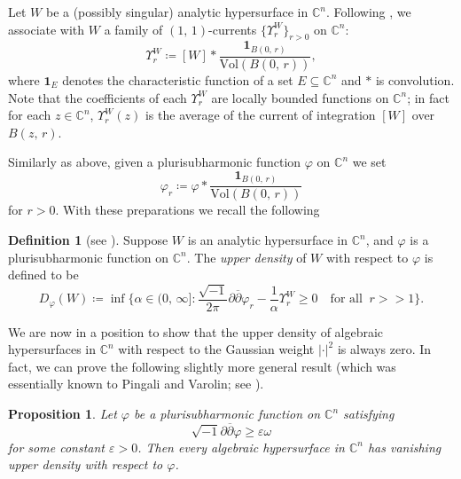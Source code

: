 \documentclass[12pt,a4paper]{amsart}
\numberwithin{equation}{section}
\newtheorem{proposition}[theorem]{Proposition}
\theoremstyle{definition}
\newtheorem{definition}{Definition}
\begin{document}
Let $W$ be a (possibly singular) analytic hypersurface in $\mathbb C^n$. Following \cite{OCS-Varolin_MA06, PV_Crelle16}, we associate with $W$ a family of $(1,\, 1)$-currents $\{\Upsilon^W_r\}_{r>0}$ on $\mathbb C^n$:
  $$
  \Upsilon^W_r \coloneqq [W]\ast \frac{\mathbf{1}_{B(0, \,r)}}{\mathrm{Vol}(B(0, \,r))},
  $$
where $\mathbf{1}_E$ denotes the characteristic function of a set $E\subseteq\mathbb C^n$ and $\ast$ is convolution. Note that the coefficients of each $\Upsilon^W_r$ are locally bounded functions on $\mathbb C^n$; in fact for each $z\in\mathbb C^n$, $\Upsilon^W_r(z)$ is the average of the current of integration $[W]$ over $B(z, \,r)$.

Similarly as above, given a plurisubharmonic function $\varphi$ on $\mathbb C^n$ we set
  $$
  \varphi_r \coloneqq \varphi \ast \frac{\mathbf{1}_{B(0, \,r)}}{\mathrm{Vol}(B(0, \,r))}
  $$
for $r>0$. With these preparations we recall the following

\begin{definition}[see \cite{OCS-Varolin_MA06, PV_Crelle16}]
Suppose $W$ is an analytic hypersurface in $\mathbb C^n$, and $\varphi$ is a plurisubharmonic function on $\mathbb C^n$. The {\it upper density} of $W$ with respect to $\varphi$ is defined to be
  $$
  D_{\varphi}(W) \coloneqq \inf\!\Big\{\alpha\in (0,\, \infty]\!:
    \frac{\sqrt{-1}}{2\pi}\partial\overline{\partial}\varphi_r
    -\frac{1}{\alpha} \Upsilon^W_r \geq 0 \quad \mbox{for all}\;\; r>>1\Big\}.
  $$
\end{definition}


We are now in a position to show that the upper density of algebraic hypersurfaces in $\mathbb C^n$ with respect to the Gaussian weight $|\cdot|^2$ is always zero. In fact, we can prove the following slightly more general result (which was essentially known to Pingali and Varolin; see \cite[Proposition 2.2]{PV_Nagoya21}).

\begin{proposition}\label{prop: density-vanishing}
Let $\varphi$ be a plurisubharmonic function on $\mathbb C^n$ satisfying
\begin{equation}\label{ineq: lower-positivity}
  \sqrt{-1}\partial\overline{\partial}\varphi \geq \varepsilon \omega
\end{equation}
for some constant $\varepsilon>0$. Then every algebraic hypersurface in $\mathbb C^n$ has vanishing upper density with respect to $\varphi$.
\end{proposition}
\end{document}
